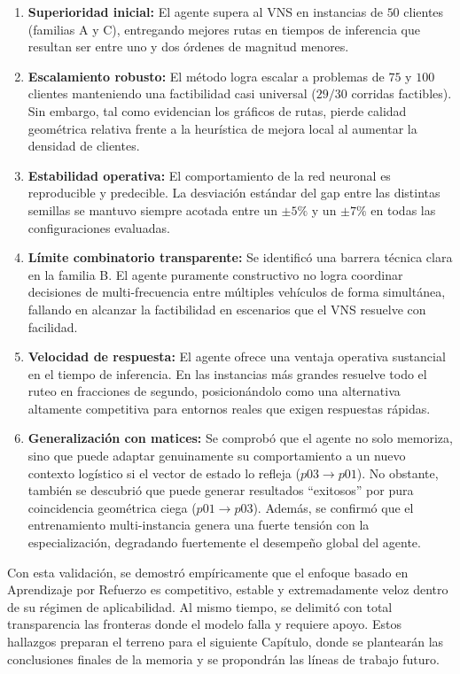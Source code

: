 \begin{enumerate}
    \item \textbf{Superioridad inicial:} El agente supera al VNS en instancias de $50$ clientes (familias A y C), entregando mejores rutas en tiempos de inferencia que resultan ser entre uno y dos órdenes de magnitud menores.

    \item \textbf{Escalamiento robusto:} El método logra escalar a problemas de $75$ y $100$ clientes manteniendo una factibilidad casi universal ($29/30$ corridas factibles). Sin embargo, tal como evidencian los gráficos de rutas, pierde calidad geométrica relativa frente a la heurística de mejora local al aumentar la densidad de clientes.

    \item \textbf{Estabilidad operativa:} El comportamiento de la red neuronal es reproducible y predecible. La desviación estándar del gap entre las distintas semillas se mantuvo siempre acotada entre un $\pm 5\%$ y un $\pm 7\%$ en todas las configuraciones evaluadas.

    \item \textbf{Límite combinatorio transparente:} Se identificó una barrera técnica clara en la familia B. El agente puramente constructivo no logra coordinar decisiones de multi-frecuencia entre múltiples vehículos de forma simultánea, fallando en alcanzar la factibilidad en escenarios que el VNS resuelve con facilidad.

    \item \textbf{Velocidad de respuesta:} El agente ofrece una ventaja operativa sustancial en el tiempo de inferencia. En las instancias más grandes resuelve todo el ruteo en fracciones de segundo, posicionándolo como una alternativa altamente competitiva para entornos reales que exigen respuestas rápidas.

    \item \textbf{Generalización con matices:} Se comprobó que el agente no solo memoriza, sino que puede adaptar genuinamente su comportamiento a un nuevo contexto logístico si el vector de estado lo refleja ($p03 \rightarrow p01$). No obstante, también se descubrió que puede generar resultados \enquote{exitosos} por pura coincidencia geométrica ciega ($p01 \rightarrow p03$). Además, se confirmó que el entrenamiento multi-instancia genera una fuerte tensión con la especialización, degradando fuertemente el desempeño global del agente.
\end{enumerate}

Con esta validación, se demostró empíricamente que el enfoque basado en Aprendizaje por Refuerzo es competitivo, estable y extremadamente veloz dentro de su régimen de aplicabilidad. Al mismo tiempo, se delimitó con total transparencia las fronteras donde el modelo falla y requiere apoyo. Estos hallazgos preparan el terreno para el siguiente Capítulo, donde se plantearán las conclusiones finales de la memoria y se propondrán las líneas de trabajo futuro.